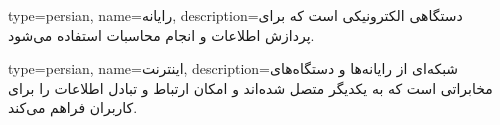 {
    type=persian,
    name={رایانه},
    description={دستگاهی الکترونیکی است که برای پردازش اطلاعات و انجام محاسبات استفاده می‌شود.}
}

{
    type=persian,
    name={اینترنت},
    description={شبکه‌ای از رایانه‌ها و دستگاه‌های مخابراتی است که به یکدیگر متصل شده‌اند و امکان ارتباط و تبادل اطلاعات را برای کاربران فراهم می‌کند.}
}
